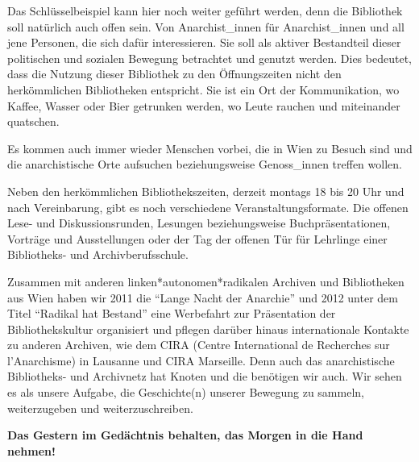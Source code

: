 \documentclass[a4paper,
fontsize=11pt,
oneside,
numbers=noperiodatend,
parskip=half-,
bibliography=totoc,
final
]{scrartcl}
\begin{document}
Das Schlüsselbeispiel kann hier noch weiter geführt werden, denn die
Bibliothek soll natürlich auch offen sein. Von Anarchist\_innen für
Anarchist\_innen und all jene Personen, die sich dafür interessieren.
Sie soll als aktiver Bestandteil dieser politischen und sozialen
Bewegung betrachtet und genutzt werden. Dies bedeutet, dass die Nutzung
dieser Bibliothek zu den Öffnungszeiten nicht den herkömmlichen
Bibliotheken entspricht. Sie ist ein Ort der Kommunikation, wo Kaffee,
Wasser oder Bier getrunken werden, wo Leute rauchen und miteinander
quatschen.

Es kommen auch immer wieder Menschen vorbei, die in Wien zu Besuch sind
und die anarchistische Orte aufsuchen beziehungsweise Genoss\_innen
treffen wollen.

Neben den herkömmlichen Bibliothekszeiten, derzeit montags 18 bis 20 Uhr
und nach Vereinbarung, gibt es noch verschiedene Veranstaltungsformate.
Die offenen Lese- und Diskussionsrunden, Lesungen beziehungsweise
Buchpräsentationen, Vorträge und Ausstellungen oder der Tag der offenen
Tür für Lehrlinge einer Bibliotheks- und Archivberufsschule.

Zusammen mit anderen linken*autonomen*radikalen Archiven und
Bibliotheken aus Wien haben wir 2011 die \enquote{Lange Nacht der
Anarchie} und 2012 unter dem Titel \enquote{Radikal hat Bestand} eine
Werbefahrt zur Präsentation der Bibliothekskultur organisiert und
pflegen darüber hinaus internationale Kontakte zu anderen Archiven, wie
dem CIRA (Centre International de Recherches sur l'Anarchisme) in
Lausanne und CIRA Marseille. Denn auch das anarchistische Bibliotheks-
und Archivnetz hat Knoten und die benötigen wir auch. Wir sehen es als
unsere Aufgabe, die Geschichte(n) unserer Bewegung zu sammeln,
weiterzugeben und weiterzuschreiben.

\textbf{Das Gestern im Gedächtnis behalten, das Morgen in die Hand
nehmen!}

\end{document}
